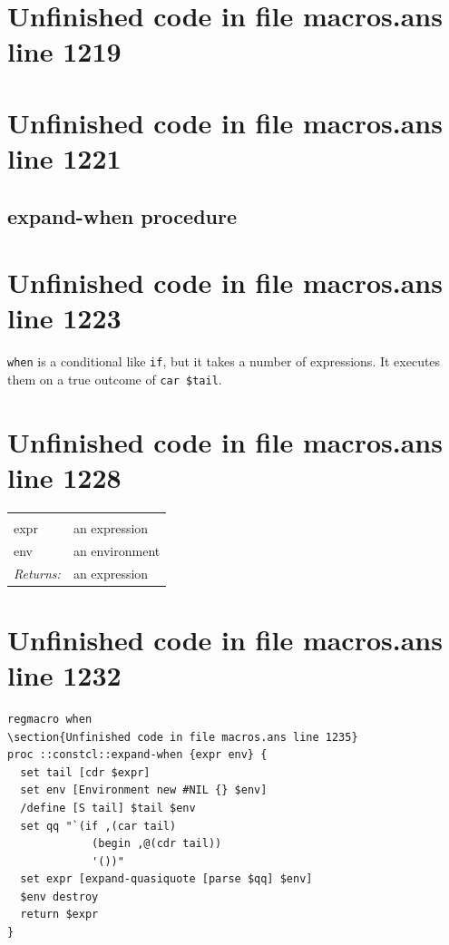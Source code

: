\documentclass[twoside,9pt]{report}
\begin{document}
\section{Unfinished code in file macros.ans line 1219}
\section{Unfinished code in file macros.ans line 1221}
\subsection{expand-when procedure}
\label{expand-when-procedure}
\section{Unfinished code in file macros.ans line 1223}


\texttt{when} is a conditional like \texttt{if}, but it takes a number of expressions. It executes them on a true outcome of \texttt{car \$tail}.

\section{Unfinished code in file macros.ans line 1228}
\noindent\begin{tabular}{ |p{1.9cm} p{8cm}| }
\hline
\rowcolor[HTML]{CCCCCC} \multicolumn{2}{|l|}{\bf expand-when (internal)} \\
expr & an expression \\
env & an environment \\
\textit{Returns:} & an expression \\
\hline
\end{tabular}
\section{Unfinished code in file macros.ans line 1232}
\begin{lstlisting}
regmacro when
\section{Unfinished code in file macros.ans line 1235}
proc ::constcl::expand-when {expr env} {
  set tail [cdr $expr]
  set env [Environment new #NIL {} $env]
  /define [S tail] $tail $env
  set qq "`(if ,(car tail)
             (begin ,@(cdr tail))
             '())"
  set expr [expand-quasiquote [parse $qq] $env]
  $env destroy
  return $expr
}
\end{lstlisting}
\end{document}
